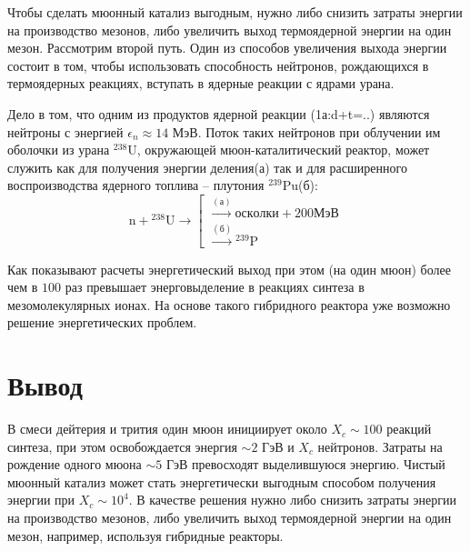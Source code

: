 \documentclass[12pt]{kiarticle} %
\begin{document}
Чтобы сделать мюонный катализ выгодным, нужно либо снизить затраты энергии на производство мезонов, либо увеличить выход термоядерной энергии на один мезон. Рассмотрим второй путь. Один из способов увеличения выхода энергии состоит в том, чтобы использовать способность нейтронов, рождающихся в термоядерных реакциях, вступать в ядерные реакции с ядрами урана. 

Дело в том, что одним из продуктов ядерной реакции (1а:d+t=..) являются нейтроны с энергией $\epsilon_n \approx 14$ МэВ. Поток таких нейтронов при облучении им оболочки из урана $^{238}$U, окружающей мюон-каталитический реактор, может служить как для получения энергии деления(а) так и для расширенного воспроизводства ядерного топлива – плутония $^{239}$Pu(б):
\begin{equation}
\mathrm{n} + {}^{238}\mathrm{U} \rightarrow
\left[\begin{array}{l}
\xrightarrow{(а)} осколки + 200 МэВ \\
\xrightarrow{(б)} {}^{239}\mathrm{P}
\end{array}\right.
\end{equation}

Как показывают расчеты энергетический выход при этом (на один мюон) более чем в $100$ раз превышает энерговыделение в реакциях синтеза в мезомолекулярных ионах. На основе такого гибридного реактора уже возможно решение энергетических проблем.

\section{Вывод}

В смеси дейтерия и трития один мюон инициирует около $X_c \sim 100$ реакций синтеза, при этом освобождается энергия $\sim 2$ ГэВ и $X_c$ нейтронов. Затраты на рождение одного мюона $\sim 5$ ГэВ превосходят выделившуюся энергию. Чистый мюонный катализ может стать энергетически выгодным способом получения энергии при $X_c \sim 10^4$. В качестве решения нужно либо снизить затраты энергии на производство мезонов, либо увеличить выход термоядерной энергии на один мезон, например, используя гибридные реакторы.
\end{document}
